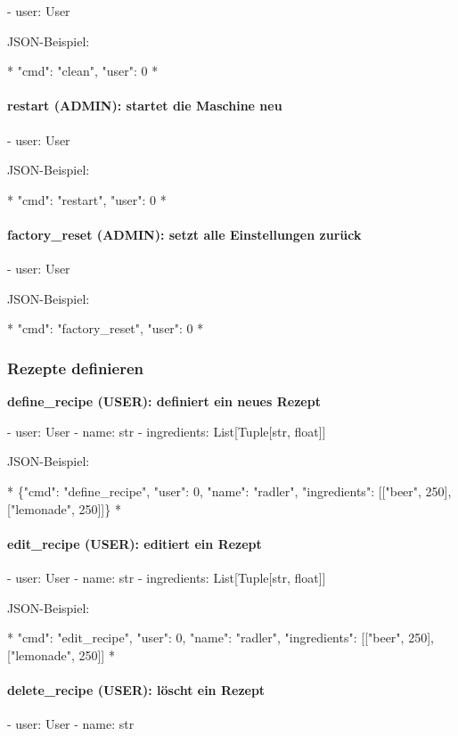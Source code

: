 - user: User

JSON-Beispiel:

*
{"cmd": "clean", "user": 0}
*

\paragraph{ restart (ADMIN): startet die Maschine neu}

- user: User

JSON-Beispiel:

*
{"cmd": "restart", "user": 0}
*

\paragraph{ factory\_reset (ADMIN): setzt alle Einstellungen zurück}

- user: User

JSON-Beispiel:

*
{"cmd": "factory\_reset", "user": 0}
*

\subsubsection{ Rezepte definieren}

\textbf{ define\_recipe (USER): definiert ein neues Rezept}

- user: User
- name: str
- ingredients: List[Tuple[str, float]]

JSON-Beispiel:

*
\{"cmd": "define\_recipe", "user": 0, "name": "radler", "ingredients": [["beer", 250], ["lemonade", 250]]\}
*

\paragraph{ edit\_recipe (USER): editiert ein Rezept}

- user: User
- name: str
- ingredients: List[Tuple[str, float]]

JSON-Beispiel:

*
{"cmd": "edit\_recipe", "user": 0, "name": "radler", "ingredients": [["beer", 250], ["lemonade", 250]]}
*

\paragraph{ delete\_recipe (USER): löscht ein Rezept}

- user: User
- name: str

